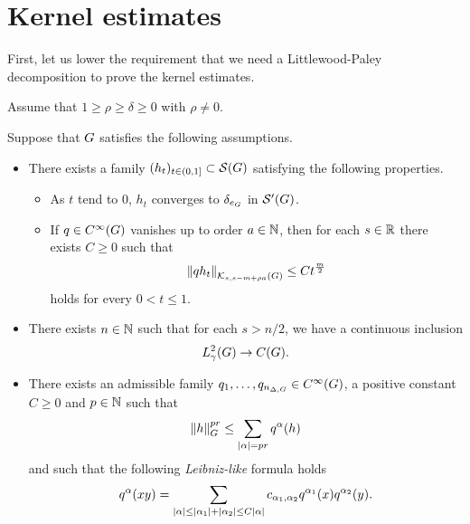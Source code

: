 \section{Kernel estimates}

First,
let us lower the requirement that we need a Littlewood-Paley decomposition
to prove the kernel estimates.

\begin{theorem}
    Assume that $1 \geq \rho \geq \delta \geq 0$ with $\rho \neq 0$.

    Suppose that $\Group$ satisfies the following assumptions.
    \begin{itemize}
        \item
            There exists a family $(h_t)_{t \in (0, 1]} \subset \Schwartz \Group$
            satisfying the following properties.
            \begin{itemize}
                \item As $t$ tend to $0$, $h_t$ converges to $\delta_{e_\Group}$ in $\TemperedDistributions \Group$.
                \item If $q \in \SmoothFunctions {\Group}$ vanishes up to order $a \in \N$,
                    then for each $s \in \R$ there exists $C \geq 0$ such that
                    \begin{align}
                        \norm [\KernelsSobolev s {s - m + \rho a}] {q h_t}
                        \leq C t^{\frac m 2}
                        \label{eq:kernel_estimates:heat_kernel_condition}
                    \end{align}
                    holds for every $0 < t \leq 1$.
            \end{itemize}
        \item There exists $n \in \N$ such that for each $s > n/2$,
            we have a continuous inclusion
            \begin{align*}
                \Sobolev \gamma \to \ContinuousFunctions \Group.
            \end{align*}
        \item There exists an admissible family $q_1, \dots, q_{\dimDifferenceOperators} \in \SmoothFunctions \Group$, a positive constant $C \geq 0$ and $p \in \N$ such that
            \begin{align*}
                \norm [\Group] h^{p r} \leq \sum_{\abs \alpha = pr} q^\alpha(h)
            \end{align*}
            and such that the following \emph{Leibniz-like} formula holds
            \begin{align*}
                q^\alpha(x y) = \sum_{\abs \alpha \leq \abs {\alpha_1} + \abs {\alpha_2} \leq C \abs \alpha}
                c_{\alpha_1, \alpha_2} q^{\alpha_1}(x) q^{\alpha_2}(y).
            \end{align*}
    \end{itemize}


\end{theorem}
